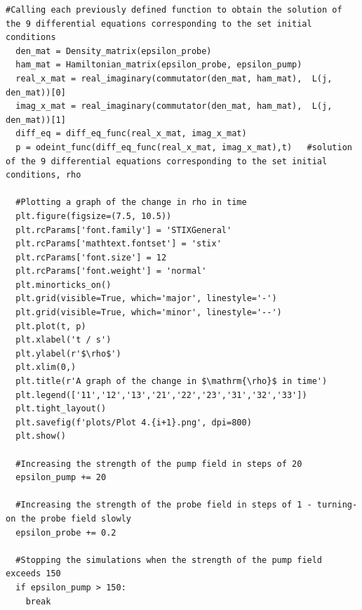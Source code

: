 \documentclass[12pt, a4paper]{article}
\begin{document}
\begin{lstlisting}[language=iPython]
  #Calling each previously defined function to obtain the solution of the 9 differential equations corresponding to the set initial conditions
  den_mat = Density_matrix(epsilon_probe)
  ham_mat = Hamiltonian_matrix(epsilon_probe, epsilon_pump)
  real_x_mat = real_imaginary(commutator(den_mat, ham_mat),  L(j, den_mat))[0]
  imag_x_mat = real_imaginary(commutator(den_mat, ham_mat),  L(j, den_mat))[1]
  diff_eq = diff_eq_func(real_x_mat, imag_x_mat)
  p = odeint_func(diff_eq_func(real_x_mat, imag_x_mat),t)   #solution of the 9 differential equations corresponding to the set initial conditions, rho

  #Plotting a graph of the change in rho in time
  plt.figure(figsize=(7.5, 10.5))
  plt.rcParams['font.family'] = 'STIXGeneral'
  plt.rcParams['mathtext.fontset'] = 'stix'
  plt.rcParams['font.size'] = 12
  plt.rcParams['font.weight'] = 'normal'
  plt.minorticks_on()
  plt.grid(visible=True, which='major', linestyle='-')
  plt.grid(visible=True, which='minor', linestyle='--')
  plt.plot(t, p)
  plt.xlabel('t / s')
  plt.ylabel(r'$\rho$')
  plt.xlim(0,)
  plt.title(r'A graph of the change in $\mathrm{\rho}$ in time')
  plt.legend(['11','12','13','21','22','23','31','32','33'])
  plt.tight_layout()
  plt.savefig(f'plots/Plot 4.{i+1}.png', dpi=800)
  plt.show()

  #Increasing the strength of the pump field in steps of 20
  epsilon_pump += 20

  #Increasing the strength of the probe field in steps of 1 - turning-on the probe field slowly
  epsilon_probe += 0.2

  #Stopping the simulations when the strength of the pump field exceeds 150
  if epsilon_pump > 150:
    break
\end{lstlisting}
\end{document}
